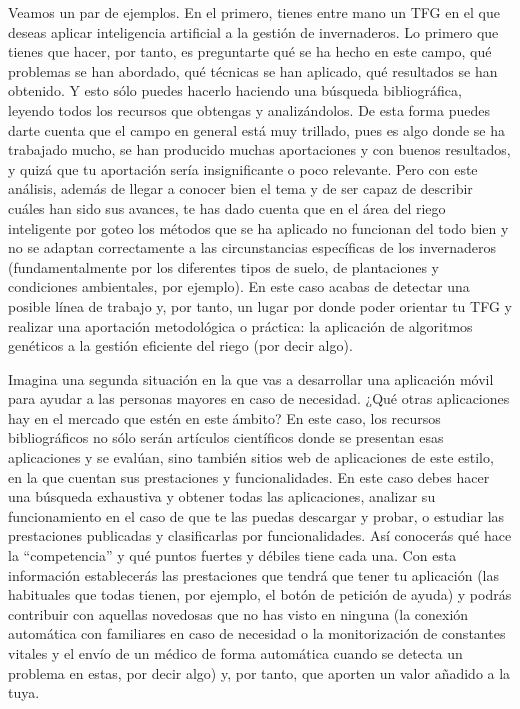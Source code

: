 Veamos un par de ejemplos. En el primero, tienes entre mano un TFG en el que deseas aplicar inteligencia artificial a la gestión de invernaderos. Lo primero que tienes que hacer, por tanto, es preguntarte qué se ha hecho en este campo, qué problemas se han abordado, qué técnicas se han aplicado, qué resultados se han obtenido. Y esto sólo puedes hacerlo haciendo una búsqueda bibliográfica, leyendo todos los recursos que obtengas y analizándolos. De esta forma puedes darte cuenta que el campo en general está muy trillado, pues es algo donde se ha trabajado mucho, se han producido muchas aportaciones y con buenos resultados, y quizá que tu aportación sería insignificante o poco relevante. Pero con este análisis, además de llegar a conocer bien el tema y de ser capaz de describir cuáles han sido sus avances, te has dado cuenta que en el área del riego inteligente por goteo los métodos que se ha aplicado no funcionan del todo bien y no se adaptan correctamente a las circunstancias específicas de los invernaderos (fundamentalmente por los diferentes tipos de suelo, de plantaciones y condiciones ambientales, por ejemplo). En este caso acabas de detectar una posible línea de trabajo y, por tanto, un lugar por donde poder orientar tu TFG y realizar una aportación metodológica o práctica: la aplicación de algoritmos genéticos a la gestión eficiente del riego (por decir algo).

Imagina una segunda situación en la que vas a desarrollar una aplicación móvil para ayudar a las personas mayores en caso de necesidad. ¿Qué otras aplicaciones hay en el mercado que estén en este ámbito? En este caso, los recursos bibliográficos no sólo serán artículos científicos donde se presentan esas aplicaciones y se evalúan, sino también  sitios web de aplicaciones de este estilo, en la que cuentan sus prestaciones y funcionalidades. En este caso debes hacer una búsqueda exhaustiva y obtener todas las aplicaciones, analizar su funcionamiento en el caso de que te las puedas descargar y probar, o estudiar las prestaciones publicadas y clasificarlas por funcionalidades. Así conocerás qué hace la ``competencia'' y qué puntos fuertes y débiles tiene cada una. Con esta información establecerás las prestaciones que tendrá que tener tu aplicación (las habituales que todas tienen, por ejemplo, el botón de petición de ayuda) y podrás contribuir con aquellas novedosas que no has visto en ninguna (la conexión automática con familiares en caso de necesidad o la monitorización de constantes vitales y el envío de un médico de forma automática cuando se detecta un problema en estas, por decir algo) y, por tanto, que aporten un valor añadido a la tuya.

